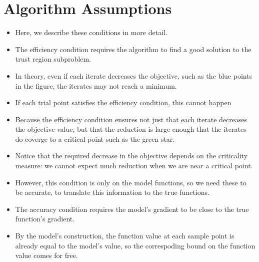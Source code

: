 \documentclass{article}
\begin{document}
	\section{Algorithm Assumptions}
\begin{itemize}
\item Here, we describe these conditions in more detail.
\item The efficiency condition requires the algorithm to find a good solution to the trust region subproblem.
\item In theory, even if each iterate decreases the objective, such as the blue points in the figure, the iterates may not reach a minimum.
\item If each trial point satisfies the efficiency condition, this cannot happen
\item Because the efficiency condition ensures not just that each iterate decreases the objective value, but that the reduction is large enough that the iterates do coverge to a critical point such as the green star.
\item Notice that the required decrease in the objective depends on the criticality measure: we cannot expect much reduction when we are near a critical point.
\end{itemize}

\hrulefill

\begin{itemize}
\item However, this condition is only on the model functions, so we need these to be accurate, to translate this information to the true functions.
\item The accuracy condition requires the model's gradient to be close to the true function's gradient.
\item By the model's construction, the function value at each sample point is already equal to the model's value, so the correspoding bound on the function value comes for free.
\end{itemize}


% 
\end{document}
